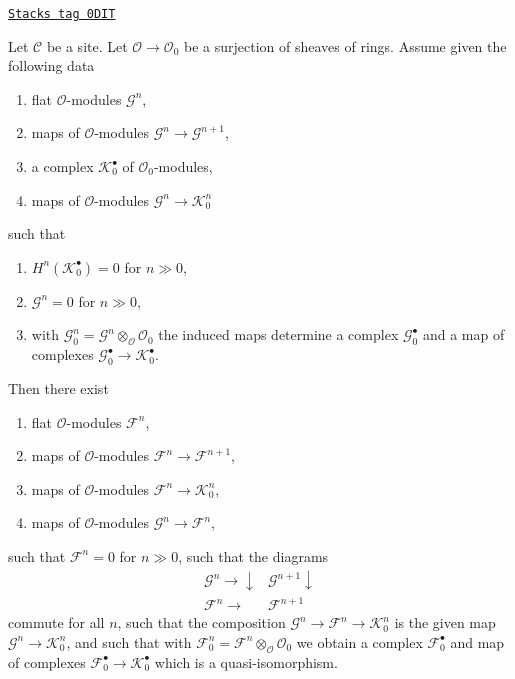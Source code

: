 \begin{lemma}
\label{defos-lemma-lift-complex}
\href{https://stacks.math.columbia.edu/tag/0DIT}{\texttt{Stacks tag 0DIT}}

Let $\mathcal{C}$ be a site. Let $\mathcal{O} \to \mathcal{O}_0$
be a surjection of sheaves of rings. Assume given the following data
\begin{enumerate}
\item flat $\mathcal{O}$-modules $\mathcal{G}^n$,
\item maps of $\mathcal{O}$-modules $\mathcal{G}^n \to \mathcal{G}^{n + 1}$,
\item a complex $\mathcal{K}_0^\bullet$ of $\mathcal{O}_0$-modules,
\item maps of $\mathcal{O}$-modules $\mathcal{G}^n \to \mathcal{K}_0^n$
\end{enumerate}
such that
\begin{enumerate}
\item[(a)] $H^n(\mathcal{K}_0^\bullet) = 0$ for $n \gg 0$,
\item[(b)] $\mathcal{G}^n = 0$ for $n \gg 0$,
\item[(c)] with
$\mathcal{G}^n_0 = \mathcal{G}^n \otimes_\mathcal{O} \mathcal{O}_0$
the induced maps determine a complex $\mathcal{G}_0^\bullet$ and a map
of complexes $\mathcal{G}_0^\bullet \to \mathcal{K}_0^\bullet$.
\end{enumerate}
Then there exist
\begin{enumerate}
\item[(\romannumeral1)]
flat $\mathcal{O}$-modules $\mathcal{F}^n$,
\item[(\romannumeral2)]
maps of $\mathcal{O}$-modules $\mathcal{F}^n \to \mathcal{F}^{n + 1}$,
\item[(\romannumeral3)]
maps of $\mathcal{O}$-modules $\mathcal{F}^n \to \mathcal{K}_0^n$,
\item[(\romannumeral4)]
maps of $\mathcal{O}$-modules $\mathcal{G}^n \to \mathcal{F}^n$,
\end{enumerate}
such that $\mathcal{F}^n = 0$ for $n \gg 0$, such that the diagrams
$$
\begin{array}{cc}\mathcal{G}^n \longrightarrow\downarrow & \mathcal{G}^{n + 1} \downarrow \\ \mathcal{F}^n \longrightarrow & \mathcal{F}^{n + 1}\end{array}
$$
commute for all $n$, such that the composition
$\mathcal{G}^n \to \mathcal{F}^n \to \mathcal{K}_0^n$
is the given map $\mathcal{G}^n \to \mathcal{K}_0^n$, and such that with
$\mathcal{F}^n_0 = \mathcal{F}^n \otimes_\mathcal{O} \mathcal{O}_0$
we obtain a complex $\mathcal{F}_0^\bullet$ and map of complexes
$\mathcal{F}_0^\bullet \to \mathcal{K}_0^\bullet$ which is a
quasi-isomorphism.
\end{lemma}

